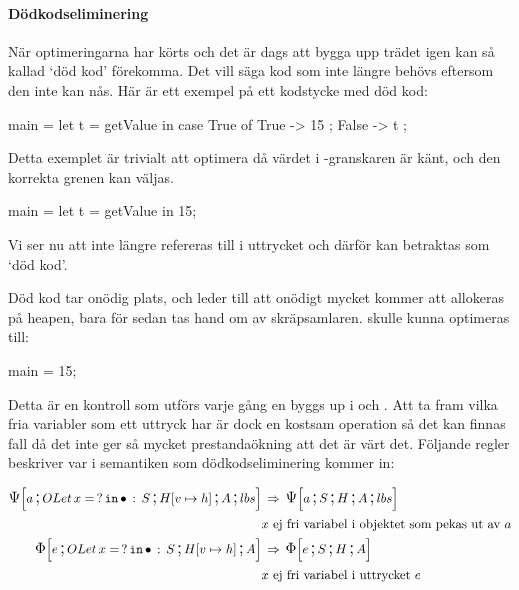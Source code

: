 \documentclass[../Optimise]{subfiles}
\begin{document}
\paragraph{Dödkodseliminering}

\label{sec:DeadCode}

När optimeringarna har körts och det är dags att bygga upp trädet igen kan
så kallad `död kod' förekomma. Det vill säga kod som inte längre 
behövs eftersom den inte kan nås. Här är ett exempel på ett kodstycke med
död kod:

\begin{codeEx}
main = let t = getValue 
       in case True of
              { True  -> 15
              ; False -> t
              };
\end{codeEx}

Detta exemplet är trivialt att optimera då värdet i -granskaren är känt, och 
den korrekta grenen kan väljas.

\begin{codeEx}
main = let t = getValue in 15;
\end{codeEx}


Vi ser nu att  inte längre refereras till i uttrycket  
och därför kan  betraktas som `död kod'. 

Död kod tar onödig plats, och leder till att onödigt mycket kommer att 
allokeras på heapen, bara för sedan tas hand om av skräpsamlaren.  skulle
kunna optimeras till:

\begin{codeEx}
main = 15;
\end{codeEx}

\begin{comment}
Denna process kan mer formellt skrivas som:

\begin{mathpar}
\inferrule
  {t\,\text{ej fri variabel i}\,e_2}
  {\mathtt{let}\,t\,=\,e_1\,\mathtt{in}\,e_2 \Rightarrow e_2}
\;
\end{mathpar}
\end{comment}

Detta är en kontroll som utförs varje gång en  byggs up 
i \iIrr  och \iPsi. Att ta fram vilka fria variabler som ett uttryck har är dock en 
kostsam operation så det kan finnas fall då det inte ger så mycket
prestandaökning att det är värt det. Följande regler beskriver
var i semantiken som dödkodseliminering kommer in:

\begin{align*}
\CBNPSI{\cOLet xS}{\heap vh}A{lbs}a & \rulesep \CBNPSI SHA{lbs}a\\
& x \text{ ej fri variabel i objektet som pekas ut av } a \nonumber \\
\CBNIRR{\cOLet xS}{\heap vh}Ae & \rulesep \CBNIRR SHAe\\
& x \text{ ej fri variabel i uttrycket } e \nonumber
\end{align*}
\end{document}
